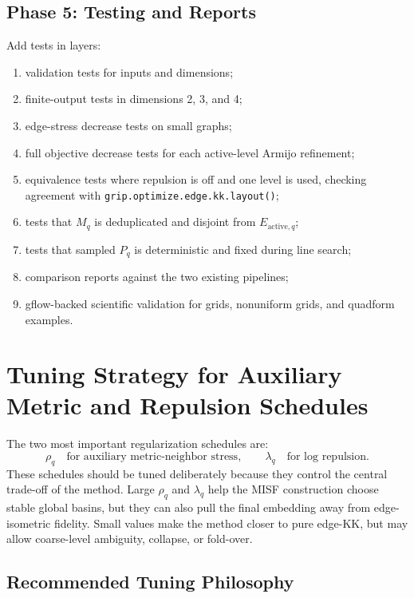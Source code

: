 \documentclass[11pt]{article}
\newcommand{\Rfunc}[1]{\texttt{#1}}
\begin{document}
\subsection{Phase 5: Testing and Reports}

Add tests in layers:
\begin{enumerate}[leftmargin=2em]
  \item validation tests for inputs and dimensions;
  \item finite-output tests in dimensions 2, 3, and 4;
  \item edge-stress decrease tests on small graphs;
  \item full objective decrease tests for each active-level Armijo refinement;
  \item equivalence tests where repulsion is off and one level is used, checking
  agreement with \Rfunc{grip.optimize.edge.kk.layout()};
  \item tests that \(M_q\) is deduplicated and disjoint from
  \(E_{\mathrm{active},q}\);
  \item tests that sampled \(P_q\) is deterministic and fixed during line
  search;
  \item comparison reports against the two existing pipelines;
  \item gflow-backed scientific validation for grids, nonuniform grids, and
  quadform examples.
\end{enumerate}

\section{Tuning Strategy for Auxiliary Metric and Repulsion Schedules}

The two most important regularization schedules are:
\[
  \rho_q \quad \text{for auxiliary metric-neighbor stress},
  \qquad
  \lambda_q \quad \text{for log repulsion}.
\]
These schedules should be tuned deliberately because they control the central
trade-off of the method. Large \(\rho_q\) and \(\lambda_q\) help the MISF
construction choose stable global basins, but they can also pull the final
embedding away from edge-isometric fidelity. Small values make the method closer
to pure edge-KK, but may allow coarse-level ambiguity, collapse, or fold-over.

\subsection{Recommended Tuning Philosophy}
\end{document}
